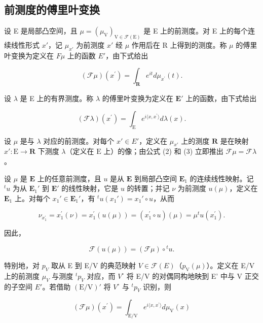 \subsection{前测度的傅里叶变换}

设 E 是局部凸空间，且 \(\mu = (\mu_{\mathrm{V}})_{\mathrm{V} \in \mathcal{F}(\mathrm{E})}\) 是 E 上的前测度。对 E 上的每个连续线性形式 \(x'\)，记 \(\mu_{x'}\) 为前测度 \(x'\) 经 \(\mu\) 作用后在 R 上得到的测度。称 \(\mu\) 的傅里叶变换为定义在 \(F\mu\) 上的函数 \(E'\)，由下式给出

\[
(\mathcal {F} \mu) (x ^ {\prime}) = \int_ {\mathbf {R}} e ^ {i t} d \mu_ {x ^ {\prime}} (t).\tag{2}
\]

设 \(\lambda\) 是 E 上的有界测度。称 \(\lambda\) 的傅里叶变换为定义在 \(\mathbf{E}'\) 上的函数，由下式给出

\[
(\mathcal {F} \lambda) (x ^ {\prime}) = \int_ {\mathrm{E}} e ^ {i \langle x, x ^ {\prime} \rangle} d \lambda (x).\tag{3}
\]

设 \(\mu\) 是与 \(\lambda\) 对应的前测度。对每个 \(x' \in E'\)，定义在 \(\mu_{x'}\) 上的测度 \(\mathbf{R}\) 是在映射 \(x': \mathrm{E} \to \mathbf{R}\) 下测度 \(\lambda\)（定义在 \(\mathrm{E}\) 上）的像；由公式 (2) 和 (3) 立即推出 \(\mathcal{F}\mu = \mathcal{F}\lambda\)。

设 \(\mu\) 是 \(\mathbf{E}\) 上的任意前测度，且 \(u\) 是从 \(\mathbf{E}\) 到局部凸空间 \(\mathbf{E}_1\) 的连续线性映射。记 \(^t u\) 为从 \(\mathbf{E}_1'\) 到 \(\mathbf{E}'\) 的线性映射，它是 \(u\) 的转置；并记 \(\nu\) 为前测度 \(u(\mu)\)，定义在 \(\mathbf{E}_1\) 上。对每个 \(x_1' \in \mathbf{E}_1'\)，有 \(^t u(x_1') = x_1' \circ u\)，从而

\[
\nu_ {x _ {1} ^ {\prime}} = x _ {1} ^ {\prime} (\nu) = x _ {1} ^ {\prime} (u (\mu)) = \left(x _ {1} ^ {\prime} \circ u\right) (\mu) = \mu^ {t} u \left(x _ {1} ^ {\prime}\right).
\]

因此，

\[
\mathscr {F} (u (\mu)) = (\mathscr {F} \mu) \circ {} ^ {t} u.\tag{4}
\]

特别地，对 \(p_{V}\) 取从 E 到 E/V 的典范映射 \(V \in \mathcal{F}(E)\)（\(p_{\mathrm{V}}(\mu)\)）。定义在 E/V 上的前测度 \(\mu_{V}\) 与测度 \(^{t}p_{V}\) 对应，而 \(V^{\circ}\) 将 E/V 的对偶同构地映到 E' 中与 V 正交的子空间 \(E'\)。若借助 \((\mathrm{E}/\mathrm{V})'\) 将 \(V^{\circ}\) 与 \(^{t}p_{V}\) 识别，则

\[
(\mathcal {F} \mu) (x ^ {\prime}) = \int_ {\mathrm{E} / \mathrm{V}} e ^ {i \langle x, x ^ {\prime} \rangle} d \mu_ {\mathrm{V}} (x)\tag{5}
\]

